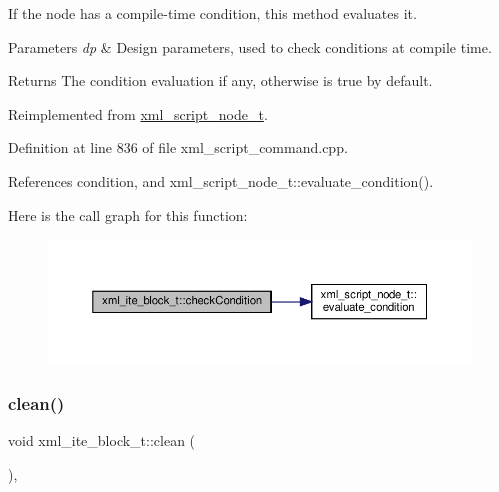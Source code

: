 If the node has a compile-\/time condition, this method evaluates it. 


\begin{DoxyParams}{Parameters}
{\em dp} & Design parameters, used to check conditions at compile time. \\
\hline
\end{DoxyParams}
\begin{DoxyReturn}{Returns}
The condition evaluation if any, otherwise is true by default. 
\end{DoxyReturn}


Reimplemented from \hyperlink{classxml__script__node__t_a13fbe7caa7bed64ab3cc25d51392523d}{xml\+\_\+script\+\_\+node\+\_\+t}.



Definition at line 836 of file xml\+\_\+script\+\_\+command.\+cpp.



References condition, and xml\+\_\+script\+\_\+node\+\_\+t\+::evaluate\+\_\+condition().

Here is the call graph for this function\+:
\nopagebreak
\begin{figure}[H]
\begin{center}
\leavevmode
\includegraphics[width=350pt]{df/d5b/classxml__ite__block__t_a8f68c01acc36d5dba8b1161994d65d17_cgraph}
\end{center}
\end{figure}
\mbox{\label{classxml__ite__block__t_ab5a5590475fc25a5601daefd8a0deac3}} 
\subsubsection{\texorpdfstring{clean()}{clean()}}
{\footnotesize\ttfamily void xml\+\_\+ite\+\_\+block\+\_\+t\+::clean (\begin{DoxyParamCaption}{ }\end{DoxyParamCaption})\hspace{0.3cm}{\ttfamily [override]}, {\ttfamily [virtual]}}



